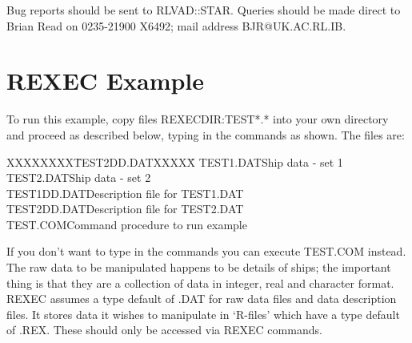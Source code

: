 Bug reports should be sent to RLVAD::STAR.
Queries should be made direct to Brian Read on 0235-21900 X6492; mail address
BJR@UK.AC.RL.IB.
\section {REXEC Example}
To run this example, copy files REXECDIR:TEST*.* into your own directory
and proceed as described below, typing in the commands as shown.
The files are:
\begin{tabbing}
XXXXXXXX\=TEST2DD.DATXXXX\=X\kill
\>\+TEST1.DAT\>Ship data - set 1\\
TEST2.DAT\>Ship data - set 2\\
TEST1DD.DAT\>Description file for TEST1.DAT\\
TEST2DD.DAT\>Description file for TEST2.DAT\\
TEST.COM\>Command procedure to run example
\end{tabbing}
If you don't want to type in the commands you can execute TEST.COM instead.
The raw data to be manipulated happens to be details of ships; the important
thing is that they are a collection of data in integer, real and character
format.
REXEC assumes a type default of .DAT for raw data files and data description
files.
It stores data it wishes to manipulate in `R-files' which have a type default
of .REX.
These should only be accessed via REXEC commands.


